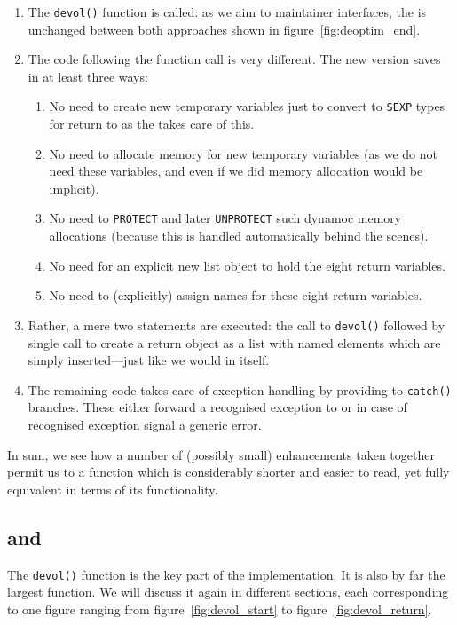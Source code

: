 \documentclass[nojss,shortnames,article]{jss}
\begin{document}
\begin{enumerate}
\item The \verb|devol()| function is called: as we aim to maintainer
  interfaces, the is unchanged between both approaches shown in
  figure~\ref{fig:deoptim_end}.
\item The code following the function call is very different.  The new
  version saves in at least three ways:
  \begin{enumerate}
  \item No need to create new temporary variables just to convert to
    \texttt{SEXP} types for return to  as the  takes
    care of this.
  \item No need to allocate memory for new temporary variables (as we do not
    need these variables, and even if we did memory allocation would be implicit).
  \item No need to \texttt{PROTECT} and later \texttt{UNPROTECT} such dynamoc
    memory allocations (because this is handled automatically behind the scenes).
  \item No need for an explicit new list object to hold the eight return variables.
  \item No need to (explicitly) assign names for these eight return
    variables.
  \end{enumerate}
\item Rather, a mere two statements are executed: the call to \verb|devol()|
  followed by single call to create a return object as a list with named
  elements which are simply inserted---just like we would in  itself.
\item The remaining code takes care of exception handling by providing to
  \verb|catch()| branches. These either forward a recognised exception to
   or in case of recognised exception signal a generic error.
\end{enumerate}

In sum, we see how a number of (possibly small) enhancements taken together
permit us to a function which is considerably shorter and easier to read, yet
fully equivalent in terms of its functionality.

\subsection[de4_0.c and devol.cpp]{ and }

The \verb|devol()| function is the key part of the 
implementation. It is also by far the largest function.  We will discuss it
again in different sections, each corresponding to one figure ranging from
figure~\ref{fig:devol_start} to figure~\ref{fig:devol_return}.
\end{document}
